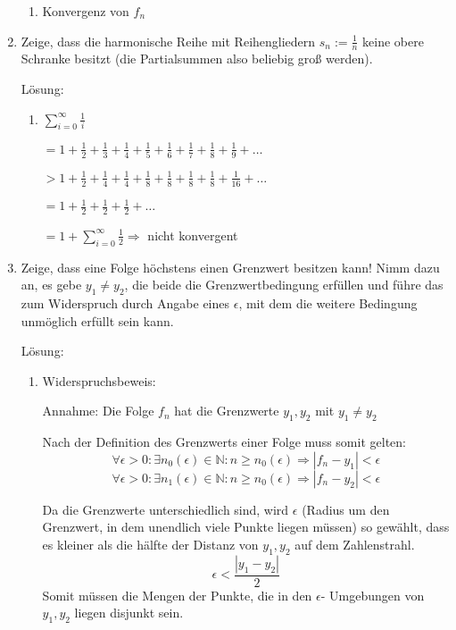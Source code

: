 \documentclass[main.tex]{subfiles}
\begin{document}
\begin{enumerate}
\begin{enumerate}
		      \item Konvergenz von \( f_n \)
	      \end{enumerate}
	\item Zeige, dass die harmonische Reihe mit Reihengliedern \( s_n := \frac{1}{n} \) keine obere
	      Schranke besitzt (die Partialsummen also beliebig groß werden).

	      Lösung:
	      \begin{enumerate}
		      \item
		            \( \sum_{i = 0}^{\infty} \frac{1}{i} \)

		            \( = 1 + \frac{1}{2} + \frac{1}{3} + \frac{1}{4} + \frac{1}{5} + \frac{1}{6}  + \frac{1}{7}  + \frac{1}{8}  + \frac{1}{9} +  \dots \)

		            \( > 1 + \frac{1}{2} + \frac{1}{4} + \frac{1}{4} + \frac{1}{8} + \frac{1}{8}  + \frac{1}{8} + \frac{1}{8}  + \frac{1}{16}+ \dots \)

		            \( = 1 + \frac{1}{2} + \frac{1}{2} + \frac{1}{2} + \dots \)

		            \( = 1 + \sum_{i = 0}^{\infty} \frac{1}{2} \Rightarrow \) nicht konvergent
	      \end{enumerate}
	\item Zeige, dass eine Folge höchstens einen Grenzwert besitzen kann!
	      Nimm dazu an, es gebe \( y_1 \neq y_2 \), die beide die Grenzwertbedingung erfüllen und
	      führe das zum Widerspruch durch Angabe eines \( \epsilon \), mit dem die weitere Bedingung
	      unmöglich erfüllt sein kann.

	      Lösung:
	      \begin{enumerate}
		      \item Widerspruchsbeweis:

		            Annahme: Die Folge \( f_n \) hat die Grenzwerte \( y_1, y_2 \) mit \( y_1 \neq y_2 \)

		            Nach der Definition des Grenzwerts einer Folge muss somit gelten:
		            \[ \forall \epsilon > 0: \exists n_0(\epsilon) \in \mathbb{N}: n \geq n_0(\epsilon) \Rightarrow |f_n - y_1| < \epsilon \]
		            \[ \forall \epsilon > 0: \exists n_1(\epsilon) \in \mathbb{N}: n \geq n_0(\epsilon) \Rightarrow |f_n - y_2| < \epsilon \]

		            Da die Grenzwerte unterschiedlich sind, wird \( \epsilon \) (Radius um den Grenzwert, in dem unendlich viele Punkte liegen müssen)
		            so gewählt, dass es kleiner als die hälfte der Distanz von \( y_1, y_2 \) auf dem Zahlenstrahl.
		            \[ \epsilon < \frac{|y_1 - y_2|}{2} \]
		            Somit müssen die Mengen der Punkte, die in den \( \epsilon \)- Umgebungen von \( y_1, y_2 \) liegen disjunkt sein.


\end{enumerate}
\end{enumerate}
\end{document}
